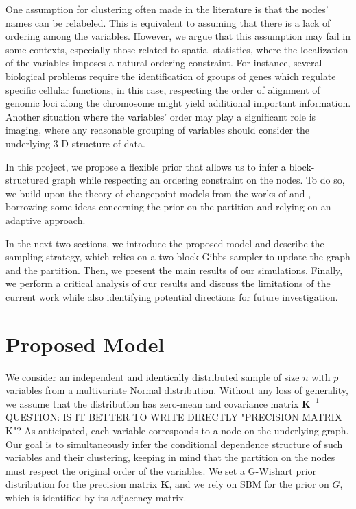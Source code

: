 One assumption for clustering often made in the literature is that the nodes' names can be relabeled. This is equivalent to assuming that there is a lack of ordering among the variables. However, we argue that this assumption may fail in some contexts, especially those related to spatial statistics, where the localization of the variables imposes a natural ordering constraint. For instance, several biological problems require the identification of groups of genes which regulate specific cellular functions; in this case, respecting the order of alignment of genomic loci along the chromosome might yield additional important information. Another situation where the variables' order may play a significant role is imaging, where any reasonable grouping of variables should consider the underlying 3-D structure of data.

In this project, we propose a flexible prior that allows us to infer a block-structured graph while respecting an ordering constraint on the nodes. To do so, we build upon the theory of changepoint models from the works of \textcite{bensonAdaptiveMCMCMultiple2018} and \textcite{martinezNonparametricChangePoint2014}, borrowing some ideas concerning the prior on the partition and relying on an adaptive approach. 

In the next two sections, we introduce the proposed model and describe the sampling strategy, which relies on a two-block Gibbs sampler to update the graph and the partition. Then, we present the main results of our simulations. Finally, we perform a critical analysis of our results and discuss the limitations of the current work while also identifying potential directions for future investigation.


\section{Proposed Model}

We consider an independent and identically distributed sample of size $n$ with $p$ variables from a multivariate Normal distribution. Without any loss of generality, we assume that the distribution has zero-mean and covariance matrix $\mathbf{K}^{-1}$ QUESTION: IS IT BETTER TO WRITE DIRECTLY "PRECISION MATRIX K"? As anticipated, each variable corresponds to a node on the underlying graph. Our goal is to simultaneously infer the conditional dependence structure of such variables and their clustering, keeping in mind that the partition on the nodes must respect the original order of the variables. We set a G-Wishart prior distribution for the precision matrix $\mathbf{K}$, and we rely on SBM for the prior on $G$, which is identified by its adjacency matrix.

